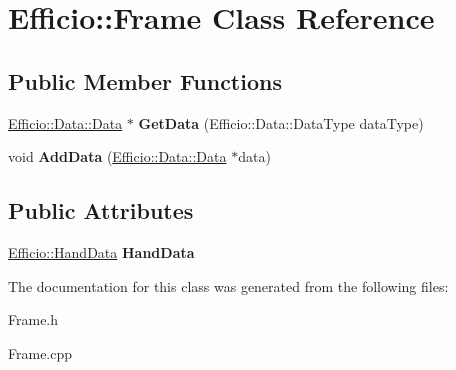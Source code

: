 \hypertarget{class_efficio_1_1_frame}{}\section{Efficio\+:\+:Frame Class Reference}
\label{class_efficio_1_1_frame}
\subsection*{Public Member Functions}
\begin{DoxyCompactItemize}
\item 
\hyperlink{class_efficio_1_1_data_1_1_data}{Efficio\+::\+Data\+::\+Data} $\ast$ {\bfseries Get\+Data} (Efficio\+::\+Data\+::\+Data\+Type data\+Type)\hypertarget{class_efficio_1_1_frame_a7f3524244cf2e511881161d525d445ea}{}\label{class_efficio_1_1_frame_a7f3524244cf2e511881161d525d445ea}

\item 
void {\bfseries Add\+Data} (\hyperlink{class_efficio_1_1_data_1_1_data}{Efficio\+::\+Data\+::\+Data} $\ast$data)\hypertarget{class_efficio_1_1_frame_a7c1ad4c47f3ff7b49d3c2942184c43fb}{}\label{class_efficio_1_1_frame_a7c1ad4c47f3ff7b49d3c2942184c43fb}

\end{DoxyCompactItemize}
\subsection*{Public Attributes}
\begin{DoxyCompactItemize}
\item 
\hyperlink{class_efficio_1_1_hand_data}{Efficio\+::\+Hand\+Data} {\bfseries Hand\+Data}\hypertarget{class_efficio_1_1_frame_a546f841f8294491f08c83ef16e5b421c}{}\label{class_efficio_1_1_frame_a546f841f8294491f08c83ef16e5b421c}

\end{DoxyCompactItemize}


The documentation for this class was generated from the following files\+:\begin{DoxyCompactItemize}
\item 
Frame.\+h\item 
Frame.\+cpp\end{DoxyCompactItemize}
